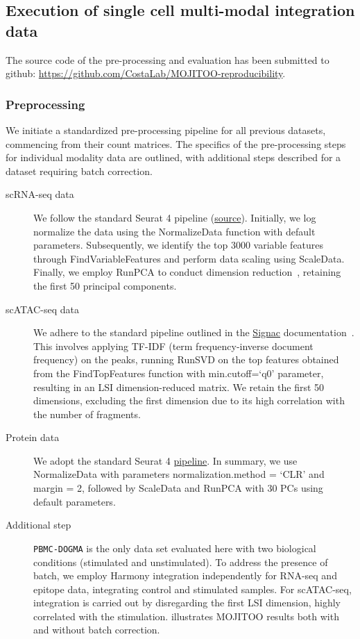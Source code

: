 \subsection{Execution of single cell multi-modal integration data}
\label{MOJITOO:exp:run}
The source code of the pre-processing and evaluation has been submitted to github: \url{https://github.com/CostaLab/MOJITOO-reproducibility}.

\subsubsection{Preprocessing}
\label{MOJITOO:exp:preprocessing}
We initiate a standardized pre-processing pipeline for all previous datasets, commencing from their count matrices. The specifics of the pre-processing steps for individual modality data are outlined, with additional steps described for a dataset requiring batch correction.
\begin{description}
    \item[scRNA-seq data]
    We follow the standard Seurat 4 pipeline (\href{https://satijalab.org/seurat/articles/pbmc3k_tutorial.html}{source}). Initially, we log normalize the data using the NormalizeData function with default parameters. Subsequently, we identify the top 3000 variable features through FindVariableFeatures and perform data scaling using ScaleData. Finally, we employ RunPCA to conduct dimension reduction~\citep{hao2021seurat4}, retaining the first 50 principal components.
    
    \item[scATAC-seq data]
    We adhere to the standard pipeline outlined in the \href{https://satijalab.org/signac/articles/pbmc_vignette.html}{Signac} documentation~\citep{signac}. This involves applying TF-IDF (term frequency-inverse document frequency) on the peaks, running RunSVD on the top features obtained from the FindTopFeatures function with min.cutoff=`q0' parameter, resulting in an LSI dimension-reduced matrix. We retain the first 50 dimensions, excluding the first dimension due to its high correlation with the number of fragments.  
    
    \item[Protein data]
    We adopt the standard Seurat 4 \href{https://satijalab.org/seurat/articles/multimodal_vignette.html}{pipeline}\citep{hao2021seurat4}. In summary, we use NormalizeData with parameters normalization.method = `CLR' and margin = 2, followed by ScaleData and RunPCA with 30 PCs using default parameters.
    
    \item[Additional step] 
    \texttt{PBMC-DOGMA} is the only data set evaluated here with two biological conditions (stimulated and unstimulated). To address the presence of batch, we employ Harmony integration\citep{korsunsky2019harmony} independently for RNA-seq and epitope data, integrating control and stimulated samples. For scATAC-seq, integration is carried out by disregarding the first LSI dimension, highly correlated with the stimulation.  illustrates MOJITOO results both with and without batch correction.
\end{description}

